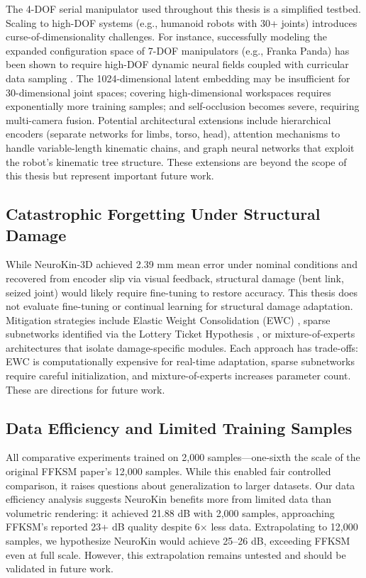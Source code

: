 \documentclass[12pt,a4paper,oneside]{report}
\begin{document}
The 4-DOF serial manipulator used throughout this thesis is a simplified testbed. Scaling to high-DOF systems (e.g., humanoid robots with 30+ joints) introduces curse-of-dimensionality challenges. For instance, successfully modeling the expanded configuration space of 7-DOF manipulators (e.g., Franka Panda) has been shown to require high-DOF dynamic neural fields coupled with curricular data sampling \cite{schulze2024high}. The 1024-dimensional latent embedding may be insufficient for 30-dimensional joint spaces; covering high-dimensional workspaces requires exponentially more training samples; and self-occlusion becomes severe, requiring multi-camera fusion. Potential architectural extensions include hierarchical encoders (separate networks for limbs, torso, head), attention mechanisms to handle variable-length kinematic chains, and graph neural networks that exploit the robot's kinematic tree structure. These extensions are beyond the scope of this thesis but represent important future work.

\subsection{Catastrophic Forgetting Under Structural Damage}

While NeuroKin-3D achieved 2.39 mm mean error under nominal conditions and recovered from encoder slip via visual feedback, structural damage (bent link, seized joint) would likely require fine-tuning to restore accuracy. This thesis does not evaluate fine-tuning or continual learning for structural damage adaptation. Mitigation strategies include Elastic Weight Consolidation (EWC) \cite{kirkpatrick2017overcoming}, sparse subnetworks identified via the Lottery Ticket Hypothesis \cite{frankle2018lottery}, or mixture-of-experts architectures that isolate damage-specific modules. Each approach has trade-offs: EWC is computationally expensive for real-time adaptation, sparse subnetworks require careful initialization, and mixture-of-experts increases parameter count. These are directions for future work.

\subsection{Data Efficiency and Limited Training Samples}

All comparative experiments trained on 2,000 samples---one-sixth the scale of the original FFKSM paper's 12,000 samples. While this enabled fair controlled comparison, it raises questions about generalization to larger datasets. Our data efficiency analysis suggests NeuroKin benefits more from limited data than volumetric rendering: it achieved 21.88 dB with 2,000 samples, approaching FFKSM's reported 23+ dB quality despite 6$\times$ less data. Extrapolating to 12,000 samples, we hypothesize NeuroKin would achieve 25--26 dB, exceeding FFKSM even at full scale. However, this extrapolation remains untested and should be validated in future work.
\end{document}
